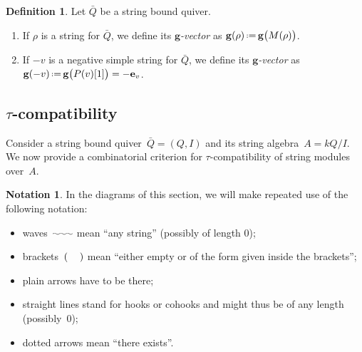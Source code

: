 \documentclass{amsart}
\theoremstyle{definition}
\newtheorem{definition}[theorem]{Definition}
\newtheorem{notation}[theorem]{Notation}
\renewcommand{\b}[1]{\mathbf{#1}} %
\newcommand{\eqdef}{\mbox{\,\raisebox{0.2ex}{\scriptsize\ensuremath{\mathrm:}}\ensuremath{=}\,}} %
\newcommand{\darkblue}{\color{darkblue}} %
\newcommand{\defn}[1]{\textsl{\darkblue #1}} %
\begin{document}
\begin{definition}
Let $\bar Q$ be a string bound quiver.
\begin{enumerate}
  \item If $\rho$ is a string for $\bar Q$, we define its \defn{$\b{g}$-vector} as $\b{g}(\rho) \eqdef \b{g} \big( M(\rho) \big)$.
  \item If $-v$ is a negative simple string for $\bar Q$, we define its \defn{$\b{g}$-vector} as $\b{g}(-v) \eqdef \b{g} \big( P(v)[1] \big) = -\b{e}_v$.
\end{enumerate}
\end{definition}

\subsection{$\tau$-compatibility}
\label{subsec:compatibility}

Consider a string bound quiver~$\bar Q = (Q,I)$ and its string algebra~${A = kQ/I}$.
We now provide a combinatorial criterion for $\tau$-compatibility of string modules over~$A$.

\begin{notation}
In the diagrams of this section, we will make repeated use of the following notation:
\begin{itemize}
 \item waves~$\xy \ar@{~} (0,0);(7,0) \endxy$ mean ``any string'' (possibly of length 0);
 \item brackets~$( \hspace{1pc} )$ mean ``either empty or of the form given inside the brackets'';
 \item plain arrows have to be there;
 \item straight lines stand for hooks or cohooks and might thus be of any length (possibly~$0$);
 \item dotted arrows mean ``there exists''.
\end{itemize}
\end{notation}
\end{document}
